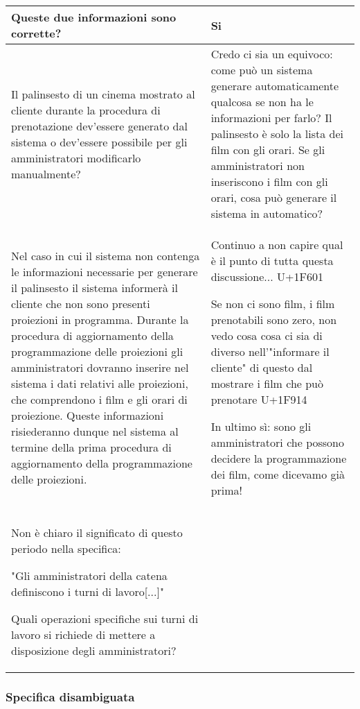 \begin{longtable}{|p{8.15cm}|p{8.15cm}|}
    Queste due informazioni sono corrette?
     & Si
    \\\hline
    Il palinsesto di un cinema mostrato al cliente durante la procedura di
    prenotazione dev'essere generato dal sistema o dev'essere possibile per
    gli amministratori modificarlo manualmente?
     & Credo ci sia un equivoco: come può un sistema generare automaticamente
    qualcosa se non ha le informazioni per farlo? Il palinsesto è solo la
    lista dei film con gli orari. Se gli amministratori non inseriscono i
    film con gli orari, cosa può generare il sistema in automatico?
    \\\hline
    Nel caso in cui il sistema non contenga le informazioni necessarie per
    generare il palinsesto il sistema informerà il cliente che non sono
    presenti proiezioni in programma.
    Durante la procedura di aggiornamento della programmazione delle
    proiezioni gli amministratori dovranno inserire nel sistema i dati relativi
    alle proiezioni, che comprendono i film e gli orari di proiezione.
    Queste informazioni risiederanno dunque nel sistema al termine della prima
    procedura di aggiornamento della programmazione delle proiezioni.
     & Continuo a non capire qual è il punto di tutta questa discussione...
    U+1F601

    Se non ci sono film, i film prenotabili sono zero, non vedo cosa cosa ci
    sia di diverso nell'"informare il cliente" di questo dal mostrare i film
    che può prenotare U+1F914

    In ultimo sì: sono gli amministratori che possono decidere la
    programmazione dei film, come dicevamo già prima!
    \\\hline
    Non è chiaro il significato di questo periodo nella specifica:

    "Gli amministratori della catena definiscono i turni di lavoro[...]"

    Quali operazioni specifiche sui turni di lavoro si richiede di mettere
    a disposizione degli amministratori?
     & \hfill
    \\\hline
\end{longtable}

\subsubsection*{Specifica disambiguata}

